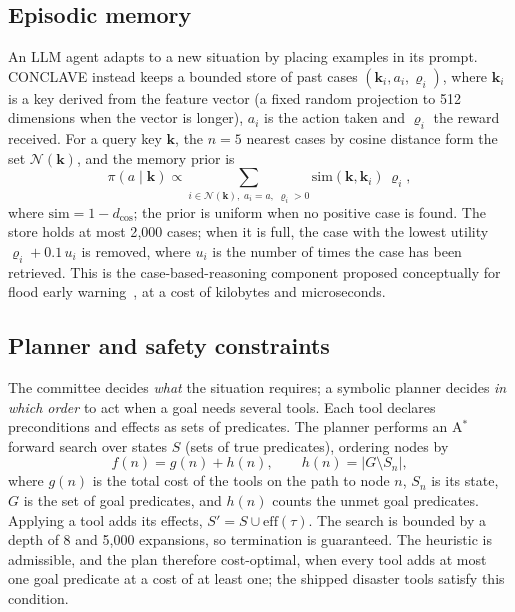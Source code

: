 \documentclass[journal]{IEEEtran}
\begin{document}
\subsection{Episodic memory}\label{sec:memory}
An LLM agent adapts to a new situation by placing examples in its prompt.
CONCLAVE instead keeps a bounded store of past cases
$(\mathbf{k}_i,a_i,\varrho_i)$, where $\mathbf{k}_i$ is a key derived from the
feature vector (a fixed random projection to 512 dimensions when the vector is
longer), $a_i$ is the action taken and $\varrho_i$ the reward received. For a
query key $\mathbf{k}$, the $n=5$ nearest cases by cosine distance form the set
$\mathcal{N}(\mathbf{k})$, and the memory prior is
\begin{equation}
\pi(a\mid\mathbf{k})\propto\sum_{i\in\mathcal{N}(\mathbf{k}),\;a_i=a,\;\varrho_i>0}
\mathrm{sim}(\mathbf{k},\mathbf{k}_i)\,\varrho_i,
\label{eq:memory}
\end{equation}
where $\mathrm{sim}=1-d_{\cos}$; the prior is uniform when no positive case is
found. The store holds at most 2{,}000 cases; when it is full, the case with
the lowest utility $\varrho_i+0.1\,u_i$ is removed, where $u_i$ is the number of
times the case has been retrieved. This is the case-based-reasoning component
proposed conceptually for flood early warning~\cite{rashid2024integrating}, at a
cost of kilobytes and microseconds.

\subsection{Planner and safety constraints}\label{sec:constraints}
The committee decides \emph{what} the situation requires; a symbolic planner
decides \emph{in which order} to act when a goal needs several tools. Each tool
declares preconditions and effects as sets of predicates. The planner performs
an A$^\ast$ forward search over states $S$ (sets of true predicates), ordering
nodes by
\begin{equation}
f(n)=g(n)+h(n),\qquad h(n)=\big|G\setminus S_n\big|,
\label{eq:astar}
\end{equation}
where $g(n)$ is the total cost of the tools on the path to node $n$, $S_n$ is
its state, $G$ is the set of goal predicates, and $h(n)$ counts the unmet goal
predicates. Applying a tool adds its effects, $S'=S\cup\mathrm{eff}(\tau)$. The
search is bounded by a depth of 8 and 5{,}000 expansions, so termination is
guaranteed. The heuristic is admissible, and the plan therefore cost-optimal,
when every tool adds at most one goal predicate at a cost of at least one; the
shipped disaster tools satisfy this condition.
\end{document}

